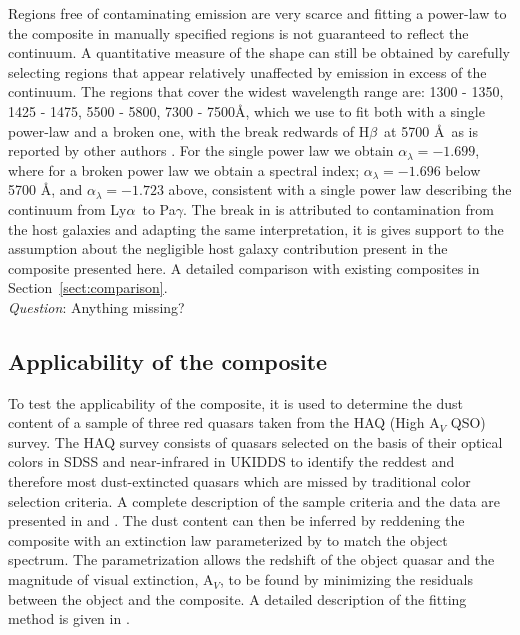 \documentclass{aa}    %
\newcommand{\sectionname}{Section}
\newcommand{\Sect}[1]{\sectionname~\ref{sect:#1}}
\newcommand{\sect}[1]{\Sect{#1}}
\newcommand{\sectlabel}[1]{\label{sect:#1}}
\newcommand{\lya}{Ly$\alpha$}
\newcommand{\hb}{H$\beta$}
\newcommand{\todo}[3]{{\color{#2}\emph{#1}: #3}}
\newcommand{\qtodo}[1]{\todo{\\ Question}{red}{#1}}
\begin{document}
Regions free of contaminating emission are very scarce and fitting a power-law to the composite in manually specified regions is not guaranteed to reflect the continuum. A quantitative measure of the shape can still be obtained by carefully selecting regions that appear relatively unaffected by emission in excess of the continuum. The regions that cover the widest wavelength range are: 1300 - 1350, 1425 - 1475, 5500 - 5800, 7300 - 7500\AA, which we use to fit both with a single power-law and a broken one, with the break redwards of \hb~at 5700 \AA~as is reported by other authors \citep{VandenBerk2001}. For the single power law we obtain $\alpha_\lambda = -1.699$, where for a broken power law we obtain a spectral index; $\alpha_\lambda = -1.696$ below 5700 \AA, and $\alpha_\lambda = -1.723$ above, consistent with a single power law describing the continuum from  \lya ~to Pa$\gamma$. The break in \cite{VandenBerk2001} is attributed to contamination from the host galaxies and adapting the same interpretation, it is gives support to the assumption about the negligible host galaxy contribution present in the composite presented here. A detailed comparison with existing composites in \sect{comparison}. \qtodo{Anything missing?}


\subsection{Applicability of the composite}  \sectlabel{application}


To test the applicability of the composite, it is used to determine the dust content of a sample of three red quasars taken from the HAQ (High A$_V$ QSO) survey. The HAQ survey consists of quasars selected on the basis of their optical colors in SDSS and near-infrared in UKIDDS to identify the reddest and therefore most dust-extincted quasars which are missed by traditional color selection criteria. A complete description of the sample criteria and the data are presented in \citet{Fynbo2013} and \citet{Krogager2015}. The dust content can then be inferred by reddening the composite with an extinction law parameterized by \cite{Gordon2003} to match the object spectrum. The parametrization allows the redshift of the object quasar and the magnitude of visual extinction, A$_V$, to be found by minimizing the residuals between the object and the composite. A detailed description of the fitting method is given in \cite{Krogager2015}.
\end{document}
